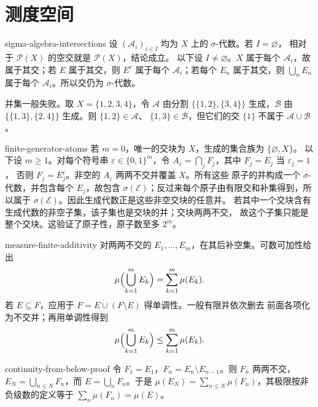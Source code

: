 \chapter{测度空间}

\begin{solution}{sigma-algebra-intersections}
设 $(\mathcal A_i)_{i\in I}$ 均为 $X$ 上的 $\sigma$-代数。若 $I=\varnothing$，
相对于 $\mathcal P(X)$ 的空交就是 $\mathcal P(X)$，结论成立。
以下设 $I\ne\varnothing$。$X$ 属于每个
$\mathcal A_i$，故属于其交；若 $E$ 属于其交，则 $E^c$ 属于每个
$\mathcal A_i$；若每个 $E_n$ 属于其交，则 $\bigcup_nE_n$ 属于每个
$\mathcal A_i$。所以交仍为 $\sigma$-代数。

并集一般失败。取 $X=\{1,2,3,4\}$，令 $\mathcal A$ 由分割
$\{\{1,2\},\{3,4\}\}$ 生成，$\mathcal B$ 由
$\{\{1,3\},\{2,4\}\}$ 生成。则 $\{1,2\}\in\mathcal A$、
$\{1,3\}\in\mathcal B$，但它们的交 $\{1\}$ 不属于
$\mathcal A\cup\mathcal B$。
\end{solution}

\begin{solution}{finite-generator-atoms}
若 $m=0$，唯一的交块为 $X$，生成的集合族为 $\{\varnothing,X\}$。
以下设 $m\ge1$。对每个符号串 $\varepsilon\in\{0,1\}^m$，令
$A_\varepsilon=\bigcap_jF_j$，其中 $F_j=E_j$ 当 $\varepsilon_j=1$，
否则 $F_j=E_j^c$。非空的 $A_\varepsilon$ 两两不交并覆盖 $X$。所有这些
原子的并构成一个 $\sigma$-代数，并包含每个 $E_j$，故包含
$\sigma(\mathcal E)$；反过来每个原子由有限交和补集得到，所以属于
$\sigma(\mathcal E)$。因此生成代数正是这些非空交块的任意并。
若其中一个交块含有生成代数的非空子集，该子集也是交块的并；交块两两不交，
故这个子集只能是整个交块。这验证了原子性，原子数至多 $2^m$。
\end{solution}

\begin{solution}{measure-finite-additivity}
对两两不交的 $E_1,\ldots,E_m$，在其后补空集。可数可加性给出
\[
 \mu\Bigl(\bigcup_{k=1}^mE_k\Bigr)=\sum_{k=1}^m\mu(E_k).
\]
若 $E\subseteq F$，应用于
$F=E\mathbin{\dot\cup}(F\setminus E)$ 得单调性。一般有限并依次删去
前面各项化为不交并；再用单调性得到
\[
 \mu\Bigl(\bigcup_{k=1}^mE_k\Bigr)\le\sum_{k=1}^m\mu(E_k).
\]
\end{solution}

\begin{solution}{continuity-from-below-proof}
令 $F_1=E_1$，$F_n=E_n\setminus E_{n-1}$。则 $F_n$ 两两不交，
$E_N=\bigcup_{n\le N}F_n$，而 $E=\bigcup_nF_n$。于是
$\mu(E_N)=\sum_{n\le N}\mu(F_n)$，其极限按非负级数的定义等于
$\sum_n\mu(F_n)=\mu(E)$。
\end{solution}

